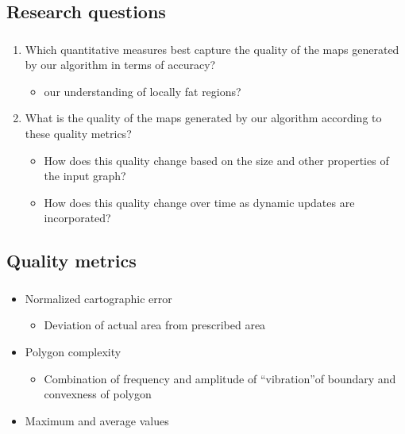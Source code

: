 \documentclass[t,18pt]{beamer}
\begin{document}
\subsection{Research questions}
\label{subsect:research-questions}

\begin{frame}
  \frametitle{}
  \begin{enumerate}
    \item Which quantitative measures best capture the quality of the maps generated by our algorithm in terms of 
accuracy? \begin{itemize}
      \item our understanding of locally fat regions?
    \end{itemize}
    \item What is the quality of the maps generated by our algorithm according to these quality metrics? \begin{itemize}
      \item How does this quality change based on the size and other properties of the input graph? 
      \item How does this quality change over time as dynamic updates are incorporated? 
    \end{itemize}
  \end{enumerate}
\end{frame}

\subsection{Quality metrics}
\label{subsect:quality-metrics}

\begin{frame}
  \frametitle{}
  \begin{itemize}
    \item Normalized cartographic error \begin{itemize}
      \item Deviation of actual area from prescribed area
    \end{itemize}
    \item Polygon complexity \begin{itemize}
      \item Combination of frequency and amplitude of “vibration”of boundary and convexness of polygon
    \end{itemize}
    \vspace{1cm}
    \item Maximum and average values
  \end{itemize}
\end{frame}
\end{document}
